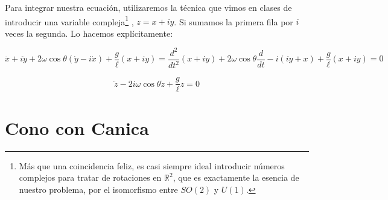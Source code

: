 \documentclass[a4paper,12pt]{article}
\begin{document}
Para integrar nuestra ecuación, utilizaremos la técnica que vimos en clases de introducir una variable compleja\footnote{Más que una coincidencia feliz, es casi siempre ideal introducir números complejos para tratar de rotaciones en $\mathbb{R}^{2}$, que es exactamente la esencia de nuestro problema, por el isomorfismo entre $SO(2)$ y $U(1)$.} , $z = x + i y $. Si sumamos la primera fila por $i$ veces la segunda. Lo hacemos explícitamente:

$$\ddot{x} + i\ddot{y} + 2\omega \cos\theta(\dot{y} -i \dot{x}) + \frac{g}{\ell} (x + i y) =\frac{d^2}{dt^2} \left(x + i y\right) + 2\omega \cos\theta\frac{d}{dt}-i (iy + x) + \frac{g}{\ell} (x + i y) = 0 $$

$$\ddot{z} - 2i\omega\cos\theta \dot{z} + \frac{g}{\ell} z = 0$$


\section{Cono con Canica}
\end{document}
